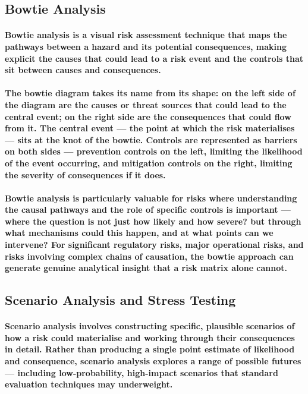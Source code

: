 \subsection{Bowtie Analysis}
\paragraph{\textbf{Bowtie analysis} is a visual risk assessment technique that maps the pathways between a hazard and its potential consequences, making explicit the causes that could lead to a risk event and the controls that sit between causes and consequences.}
\paragraph{The bowtie diagram takes its name from its shape: on the left side of the diagram are the causes or threat sources that could lead to the central event; on the right side are the consequences that could flow from it. The central event — the point at which the risk materialises — sits at the knot of the bowtie. Controls are represented as barriers on both sides — prevention controls on the left, limiting the likelihood of the event occurring, and mitigation controls on the right, limiting the severity of consequences if it does.}
\paragraph{Bowtie analysis is particularly valuable for risks where understanding the causal pathways and the role of specific controls is important — where the question is not just how likely and how severe? but through what mechanisms could this happen, and at what points can we intervene? For significant regulatory risks, major operational risks, and risks involving complex chains of causation, the bowtie approach can generate genuine analytical insight that a risk matrix alone cannot.}

\subsection{Scenario Analysis and Stress Testing}
\paragraph{\textbf{Scenario analysis} involves constructing specific, plausible scenarios of how a risk could materialise and working through their consequences in detail. Rather than producing a single point estimate of likelihood and consequence, scenario analysis explores a range of possible futures — including low-probability, high-impact scenarios that standard evaluation techniques may underweight.}
